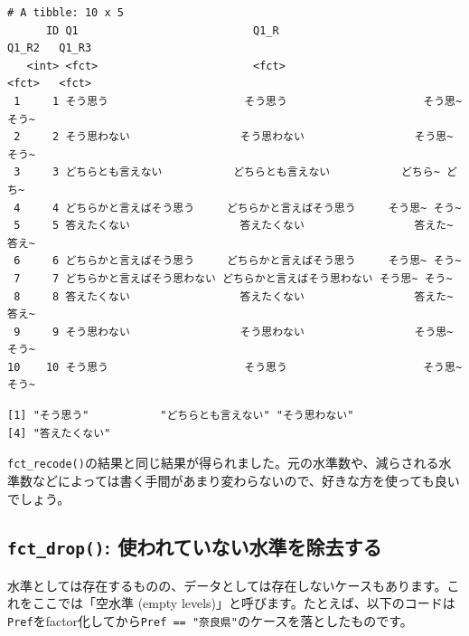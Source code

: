 \documentclass[
  a4paper,
  pandoc,
  ja=standard,
  jafont=haranoaji]{bxjsbook}
\newenvironment{Shaded}{\begin{snugshade}}{\end{snugshade}}
\newcommand{\FunctionTok}[1]{\textcolor[rgb]{0.28,0.35,0.67}{#1}}
\newcommand{\NormalTok}[1]{\textcolor[rgb]{0.00,0.48,0.65}{#1}}
\newcommand{\SpecialCharTok}[1]{\textcolor[rgb]{0.37,0.37,0.37}{#1}}
\begin{document}
\begin{verbatim}
# A tibble: 10 x 5
      ID Q1                           Q1_R                         Q1_R2   Q1_R3
   <int> <fct>                        <fct>                        <fct>   <fct>
 1     1 そう思う                     そう思う                     そう思~ そう~
 2     2 そう思わない                 そう思わない                 そう思~ そう~
 3     3 どちらとも言えない           どちらとも言えない           どちら~ どち~
 4     4 どちらかと言えばそう思う     どちらかと言えばそう思う     そう思~ そう~
 5     5 答えたくない                 答えたくない                 答えた~ 答え~
 6     6 どちらかと言えばそう思う     どちらかと言えばそう思う     そう思~ そう~
 7     7 どちらかと言えばそう思わない どちらかと言えばそう思わない そう思~ そう~
 8     8 答えたくない                 答えたくない                 答えた~ 答え~
 9     9 そう思わない                 そう思わない                 そう思~ そう~
10    10 そう思う                     そう思う                     そう思~ そう~
\end{verbatim}

\begin{Shaded}
\end{Shaded}

\begin{verbatim}
[1] "そう思う"           "どちらとも言えない" "そう思わない"      
[4] "答えたくない"      
\end{verbatim}

\texttt{fct\_recode()}の結果と同じ結果が得られました。元の水準数や、減らされる水準数などによっては書く手間があまり変わらないので、好きな方を使っても良いでしょう。

\hypertarget{fct_drop-ux4f7fux308fux308cux3066ux3044ux306aux3044ux6c34ux6e96ux3092ux9664ux53bbux3059ux308b}{%
\subsection{\texorpdfstring{\texttt{fct\_drop()}:
使われていない水準を除去する}{fct\_drop(): 使われていない水準を除去する}}\label{fct_drop-ux4f7fux308fux308cux3066ux3044ux306aux3044ux6c34ux6e96ux3092ux9664ux53bbux3059ux308b}}

水準としては存在するものの、データとしては存在しないケースもあります。これをここでは「空水準
(empty
levels)」と呼びます。たとえば、以下のコードは\texttt{Pref}をfactor化してから\texttt{Pref\ ==\ "奈良県"}のケースを落としたものです。
\end{document}
